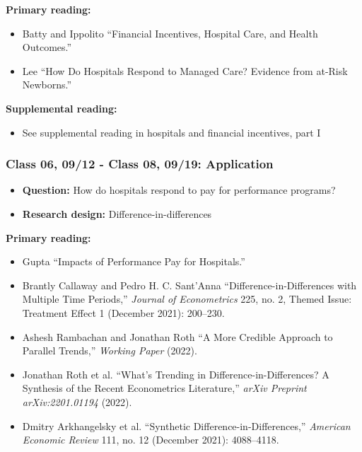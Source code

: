 \documentclass[11pt,]{article}
\providecommand{\tightlist}{%
  \setlength{\itemsep}{0pt}\setlength{\parskip}{0pt}}
\begin{document}
\textbf{Primary reading:}

\begin{itemize}
\tightlist
\item
  Batty and Ippolito {``Financial Incentives, Hospital Care, and Health
  Outcomes.''}
\item
  Lee {``How Do Hospitals Respond to Managed Care? {Evidence} from
  at-Risk Newborns.''}
\end{itemize}

\textbf{Supplemental reading:}

\begin{itemize}
\tightlist
\item
  See supplemental reading in hospitals and financial incentives, part I
\end{itemize}

\hypertarget{class-06-0912---class-08-0919-application}{%
\subsubsection{Class 06, 09/12 - Class 08, 09/19:
Application}\label{class-06-0912---class-08-0919-application}}

\begin{itemize}
\tightlist
\item
  \textbf{Question:} How do hospitals respond to pay for performance
  programs?
\item
  \textbf{Research design:} Difference-in-differences
\end{itemize}

\textbf{Primary reading:}

\begin{itemize}
\tightlist
\item
  Gupta {``Impacts of {Performance} {Pay} for {Hospitals}.''}
\item
  Brantly Callaway and Pedro H. C. Sant'Anna
  {``Difference-in-{Differences} with Multiple Time Periods,''}
  \emph{Journal of Econometrics} 225, no. 2, Themed {Issue}: {Treatment}
  {Effect} 1 (December 2021): 200--230.
\item
  Ashesh Rambachan and Jonathan Roth {``A {More} {Credible} {Approach}
  to {Parallel} {Trends},''} \emph{Working Paper} (2022).
\item
  Jonathan Roth et al. {``What's {Trending} in
  {Difference}-in-{Differences}? {A} {Synthesis} of the {Recent}
  {Econometrics} {Literature},''} \emph{arXiv Preprint arXiv:2201.01194}
  (2022).
\item
  Dmitry Arkhangelsky et al. {``Synthetic
  {Difference}-in-{Differences},''} \emph{American Economic Review} 111,
  no. 12 (December 2021): 4088--4118.
\end{itemize}
\end{document}
